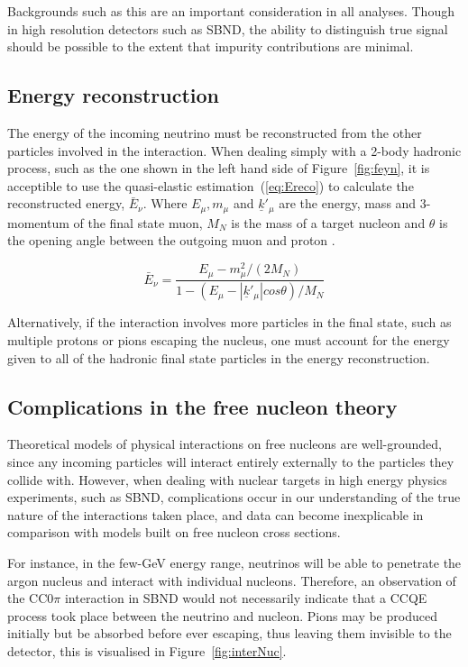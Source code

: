     Backgrounds such as this are an important consideration in all analyses. Though in high resolution detectors such as SBND, the ability to distinguish true signal should be possible to the extent that impurity contributions are minimal. 

\subsection{Energy reconstruction}

    The energy of the incoming neutrino must be reconstructed from the other particles involved in the interaction. When dealing simply with a 2-body hadronic process, such as the one shown in the left hand side of Figure~\ref{fig:feyn}, it is acceptible to use the quasi-elastic estimation~(\ref{eq:Ereco}) \cite{teppei} to calculate the reconstructed energy, $\bar{E}_{\nu}$. Where $E_{\mu}, m_{\mu}$ and $\underline{k}'_{\mu}$ are the energy, mass and 3-momentum of the final state
    muon, $M_{N}$ is the mass of a target nucleon and $\theta$ is the opening angle between the outgoing muon and proton \cite{teppei}.  


    \begin{equation}\label{eq:Ereco}
        \bar{E}_{\nu} = \frac{ E_{\mu} - m^{2}_{\mu} / (2M_{N}) }{ 1 - ( E_{\mu} - |\underline{k}'_{\mu}| cos \theta ) / M_{N} }
    \end{equation}

Alternatively, if the interaction involves more particles in the final state, such as multiple protons or pions escaping the nucleus, one must account for the energy given to all of the hadronic final state particles in the energy reconstruction. 

\subsection{Complications in the free nucleon theory}

Theoretical models of physical interactions on free nucleons are well-grounded, since any incoming particles will interact entirely externally to the particles they collide with. However, when dealing with nuclear targets in high energy physics experiments, such as SBND, complications occur in our understanding of the true nature of the interactions taken place, and data can become inexplicable in comparison with models built on free nucleon cross sections. 

For instance, in the few-GeV energy range, neutrinos will be able to penetrate the argon nucleus and interact with individual nucleons. Therefore, an observation of the CC0\(\pi\) interaction in SBND would not necessarily indicate that a CCQE process took place between the neutrino and nucleon. Pions may be produced initially but be absorbed before ever escaping, thus leaving them invisible to the detector, this is visualised in Figure~\ref{fig:interNuc}.

